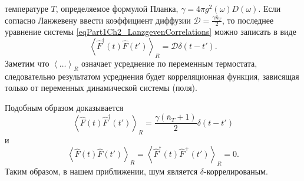 температуре $T$, определяемое формулой Планка,
$\gamma = 4 \pi g^2\left(\omega\right)D\left(\omega\right)$.
Если согласно Ланжевену ввести коэффициент диффузии $\mathcal{D} =
\frac{\gamma \bar{n}_{T}}{2}$, то последнее уравнение системы
\eqref{eqPart1Ch2_LanzgevenCorrelations} можно записать в виде
\begin{equation}
\left<\hat{F}^{\dag}\left(t\right)\hat{F}\left(t'\right)\right>_R = 
\mathcal{D} \delta\left(t - t'\right). 
\nonumber
\end{equation}
Заметим что $\left<\dots\right>_R$ означает усреднение по переменным
термостата, следовательно результатом усреднения будет корреляционная
функция, зависящая только от переменных динамической системы (поля).

Подобным образом доказывается
\begin{equation}
\left<\hat{F}\left(t\right)\hat{F}^{\dag}\left(t'\right)\right>_R = 
\frac{\gamma\left(\bar{n}_{T} + 1\right)}{2} \delta\left(t - t'\right)
\label{eqPart1Ch2_Lanzgeven_Task1}
\end{equation}
и
\begin{equation}
\left<\hat{F}\left(t\right)\hat{F}\left(t'\right)\right>_R = 
\left<\hat{F}^{\dag}\left(t\right)\hat{F}^{+}\left(t'\right)\right>_R = 0.
\label{eqPart1Ch2_Lanzgeven_Task2}
\end{equation}
Таким образом, в нашем приближении, шум является
$\delta$-коррелированым.


